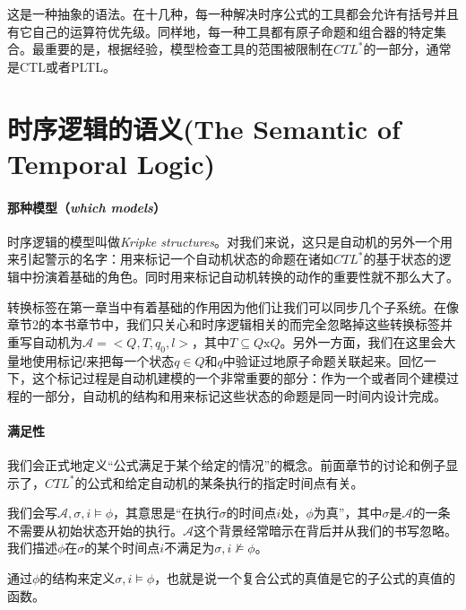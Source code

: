 \documentclass{book}
\begin{document}
    这是一种抽象的语法。在十几种，每一种解决时序公式的工具都会允许有括号并且有它自己的运算符优先级。同样地，每一种工具都有原子命题和组合器的特定集合。最重要的是，根据经验，模型检查工具的范围被限制在$CTL^*$的一部分，通常是CTL或者PLTL。

    \section{时序逻辑的语义(The Semantic of Temporal Logic)}

    \paragraph{那种模型（{\itshape which models}）}时序逻辑的模型叫做{\itshape Kripke structures}。对我们来说，这只是自动机的另外一个用来引起警示的名字：用来标记一个自动机状态的命题在诸如$CTL^*$的基于状态的逻辑中扮演着基础的角色。同时用来标记自动机转换的动作的重要性就不那么大了。

    转换标签在第一章当中有着基础的作用因为他们让我们可以同步几个子系统。在像章节2的本书章节中，我们只关心和时序逻辑相关的而完全忽略掉这些转换标签并重写自动机为$\mathcal{A}=<Q,T,q_0,l>$，其中$T \subseteq Q \text{x} Q$。另外一方面，我们在这里会大量地使用标记$l$来把每一个状态$q \in Q$和$q$中验证过地原子命题关联起来。回忆一下，这个标记过程是自动机建模的一个非常重要的部分：作为一个或者同个建模过程的一部分，自动机的结构和用来标记这些状态的命题是同一时间内设计完成。

    \paragraph{满足性}我们会正式地定义“公式满足于某个给定的情况”的概念。前面章节的讨论和例子显示了，$CTL^*$的公式和给定自动机的某条执行的指定时间点有关。

    我们会写$\mathcal{A}, \sigma, i \models \phi $，其意思是“在执行$\sigma$的时间点$i$处，$\phi$为真”，其中$\sigma$是$\mathcal{A}$的一条不需要从初始状态开始的执行。$\mathcal{A}$这个背景经常暗示在背后并从我们的书写忽略。我们描述$\phi$在$\sigma$的某个时间点$i$不满足为$\sigma, i\nvDash \phi$。

    通过$\phi$的结构来定义$\sigma, i \models \phi$，也就是说一个复合公式的真值是它的子公式的真值的函数。
\end{document}
